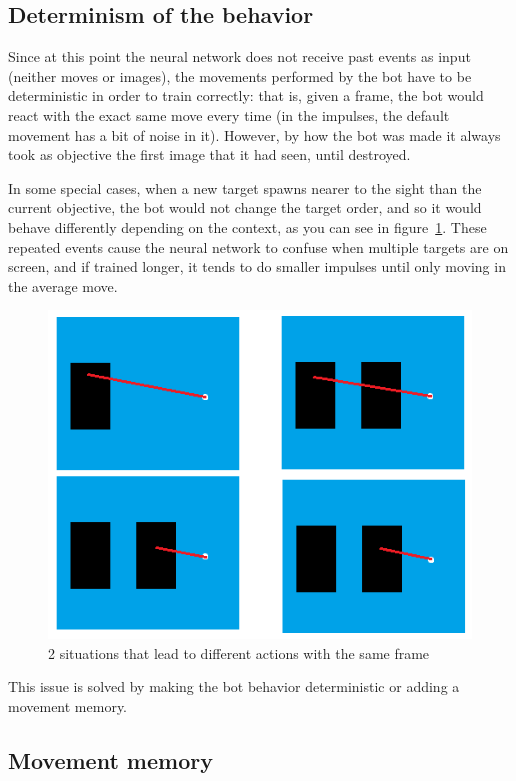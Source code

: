 \subsection{Determinism of the behavior}
\label{sec:determ}

Since at this point the neural network does not receive past events as input (neither moves or images), the movements performed by the bot have to be deterministic in order to train correctly: that is, given a frame, the bot would react with the exact same move every time (in the impulses, the default movement has a bit of noise in it). However, by how the bot was made it always took as objective the first image that it had seen, until destroyed.

In some special cases, when a new target spawns nearer to the sight than the current objective, the bot would not change the target order, and so it would behave differently depending on the context, as you can see in figure~\ref{fig:graphTR}. These repeated events cause the neural network to confuse when multiple targets are on screen, and if trained longer, it tends to do smaller impulses until only moving in the average move.

\begin{figure}[h]
  \centering
		\includegraphics[width=.9\textwidth]{img/exampleDet.png}
  \caption{2 situations that lead to different actions with the same frame}
  \label{fig:graphTR}
\end{figure}

This issue is solved by making the bot behavior deterministic or adding a movement memory.

\subsection{Movement memory}

